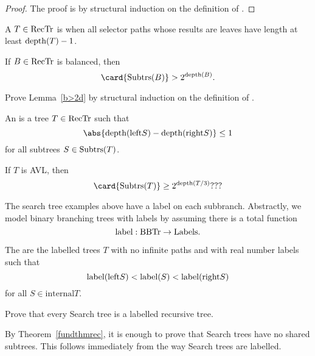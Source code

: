 \begin{proof}
The proof is by structural induction on the definition of \rectr.

\end{proof} 

A $T \in \text{RecTr}$ is  when all selector paths whose
results are leaves have length at least $\text{depth}(T) -1$.

\begin{lemma}\label{b>2d}
If $B \in \text{RecTr}$ is balanced, then
\[
\card{\subbrn{B}} > 2^{\text{depth}(B)}.
\]
\end{lemma}

\begin{problem}
Prove Lemma~\ref{b>2d} by structural induction on the definition of \rectr.

\begin{solution}
\end{solution}
\end{problem}


An  is a tree $T\in \text{RecTr}$ such that
\[
\abs{\trdpth{\leftsub{S}} - \trdpth{\rightsub{S}}} \leq 1
\]
for all subtrees $S \in \text{Subtrs}(T)$.

\begin{lemma}\label{}
If $T$ is AVL, then
\[
\card{\subbrn{T}} \geq 2^{\text{depth}(T/3)}???
\]
\end{lemma}

The search tree examples above have a label on each subbranch.
Abstractly, we model binary branching trees with labels by assuming
there is a total function
\[
\text{label}:\text{BBTr} \to \text{Labels}.
\]

\begin{definition}
The  are the labelled trees $T$ with no infinite
paths and with real number labels such that
\[
\text{label}(\text{left}S) < \text{label}(S) < \text{label}(\text{right}S)
\]
for all $S \in \text{internal}{T}$.
\end{definition}

\begin{problem}
Prove that every Search tree is a labelled recursive tree.

\begin{solution}
By Theorem~\ref{fundthmrec}, it is enough to prove that Search trees
have no shared subtrees.  This follows immediately from the way Search
trees are labelled.
\end{solution}
\end{problem}


